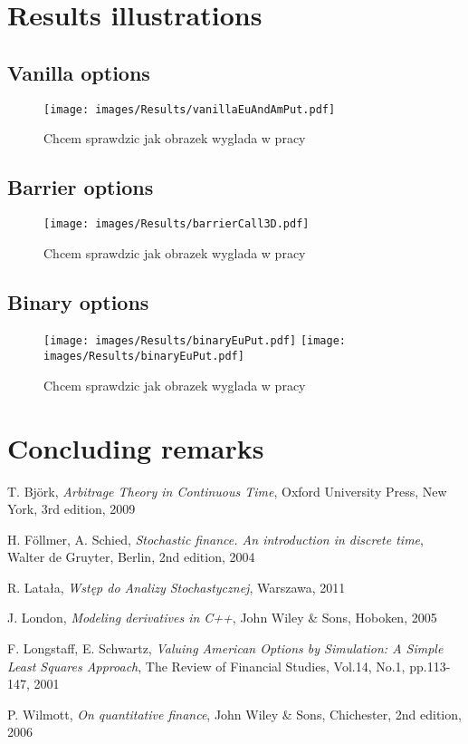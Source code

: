 \documentclass[a4paper,11pt, twoside]{book}
\theoremstyle{definition}
\theoremstyle{remark}
\begin{document}
\chapter{Results illustrations}
 
\section{Vanilla options}

\begin{figure}[!ht]
\centering
 \texttt{[image: images/Results/vanillaEuAndAmPut.pdf]}
\caption{Chcem sprawdzic jak obrazek wyglada w pracy}
\label{fig:results:dupa1}
\end{figure}

\section{Barrier options}
\begin{figure}[!ht]
\centering
 \texttt{[image: images/Results/barrierCall3D.pdf]}
\caption{Chcem sprawdzic jak obrazek wyglada w pracy}
\label{fig:results:dupa2}
\end{figure}

\section{Binary options}
\begin{figure}[!ht]
\centering
 \texttt{[image: images/Results/binaryEuPut.pdf]}
 \texttt{[image: images/Results/binaryEuPut.pdf]}
\caption{Chcem sprawdzic jak obrazek wyglada w pracy}
\label{fig:results:dupa3}
\end{figure}

\chapter*{Concluding remarks}
 

\begin{thebibliography}{99}

T. Bj\"{o}rk, \emph{Arbitrage Theory in Continuous Time}, Oxford University Press,  New York, 3rd edition, 2009

H. F\"{o}llmer, A. Schied, \emph{Stochastic finance. An introduction in discrete time}, Walter de Gruyter, Berlin, 2nd edition, 2004

R. Latała, \emph{Wstęp do Analizy Stochastycznej}, Warszawa, 2011

J. London, \emph{Modeling derivatives in C++}, John Wiley \& Sons, Hoboken, 2005

F. Longstaff, E. Schwartz, \emph{Valuing American Options by Simulation: A Simple Least Squares Approach}, The Review of Financial Studies, Vol.14, No.1, pp.113-147, 2001

P. Wilmott, \emph{On quantitative finance}, John Wiley \& Sons, Chichester, 2nd edition, 2006

\end{thebibliography}
\end{document}
